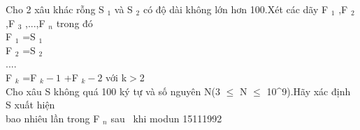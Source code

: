 Cho 2 xâu khác rỗng S   $_    1   $   và S   $_    2   $   có độ dài không lớn hơn 100.Xét các dãy F   $_    1   $   ,F   $_    2   $   ,F   $_    3   $   ,...,F   $_    n   $   trong đó   
\\   F   $_    1   $   =S   $_    1   $
\\   F   $_    2   $   =S   $_    2   $
\\   ....   
\\   F   $_    k   $   =F   $_    k-1   $   +F   $_    k-2   $   với k$>$2   
\\   Cho xâu S không quá 100 ký tự và số nguyên N(3 $\le$ N $\le$ 10^9).Hãy xác định S xuất hiện   
\\   bao nhiêu lần trong F   $_    n   $   sau  khi modun 15111992   
\\
\\
\\